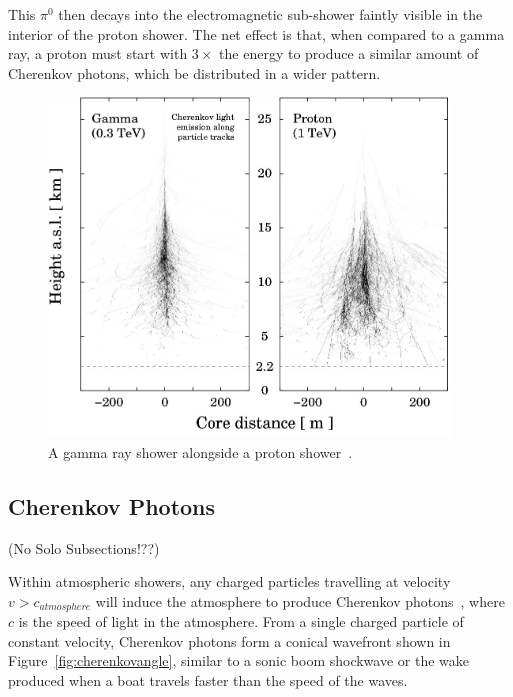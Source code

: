   This $\pi^{0}$ then decays into the electromagnetic sub-shower faintly visible in the interior of the proton shower.
  The net effect is that, when compared to a gamma ray, a proton must start with $3\times$ the energy to produce a similar amount of Cherenkov photons, which be distributed in a wider pattern.

  \begin{figure}[ht]
    \centering
    \includegraphics[width=0.95\textwidth]{images/showers_gamma_proton}
    \caption[Gamma Ray and Proton Showers]{
      A gamma ray shower alongside a proton shower~\cite{Bernlohr2008149}.
    }
    \label{fig:gamma_vs_proton_airshower}
  \end{figure}
  
  \FloatBarrier

  \subsection{Cherenkov Photons}\label{sec:cherenkov}
  {\color{red}(No Solo Subsections!??)}

  Within atmospheric showers, any charged particles travelling at velocity $v > c_{atmosphere}$ will induce the atmosphere to produce Cherenkov photons~\cite{cherenkov}, where $c$ is the speed of light in the atmosphere.
  From a single charged particle of constant velocity, Cherenkov photons form a conical wavefront shown in Figure~\ref{fig:cherenkovangle}, similar to a sonic boom shockwave or the wake produced when a boat travels faster than the speed of the waves.

